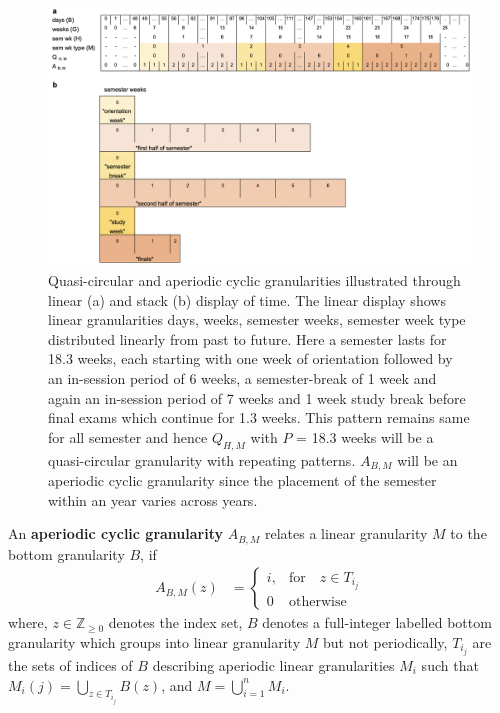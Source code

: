 \documentclass[12pt]{article}
\begin{document}
\begin{figure}

{\centering \includegraphics[width=1\linewidth]{Figs/aperiodic-ex3} 

}

\caption{Quasi-circular and aperiodic cyclic granularities illustrated through linear (a) and stack (b) display of time. The linear display shows linear granularities days, weeks, semester weeks, semester week type distributed linearly from past to future. Here a semester lasts for 18.3 weeks, each starting with one week of orientation followed by an in-session period of 6 weeks, a semester-break of 1 week and again an in-session period of 7 weeks and 1 week study break before final exams which continue for 1.3 weeks. This pattern remains same for all semester and hence \(Q_{H, M}\) with \(P\) = 18.3 weeks will be a quasi-circular granularity with repeating patterns. \(A_{B, M}\) will be an aperiodic cyclic granularity since the placement of the semester within an year varies across years.}\label{fig:aperiodic-example}
\end{figure}



\begin{definition}\label{def:aperiodic}
An {\bf aperiodic cyclic granularity} $A_{B, M}$ relates a linear granularity $M$ to the bottom granularity $B$, if
\begin{equation}\label{eq:aperiodic}
\begin{split}
A_{B, M}(z) & =
\begin{cases}
i, & \text{for}\quad z \in T_{i_j} \\
0  & \text{otherwise}
\end{cases}
\end{split}
\end{equation}
where,
$z \in \mathbb{Z}_{\geq 0}$ denotes the index set,
$B$ denotes a full-integer labelled bottom granularity which groups into linear granularity $M$ but not periodically, $T_{i_j}$ are the sets of indices of $B$ describing aperiodic linear granularities $M_{i}$ such that $M_{i}(j) = \bigcup_{z \in T_{i_j}}B(z)$, and $M = \bigcup_{i=1}^{n}M_{i}$.
\end{definition}
\end{document}
